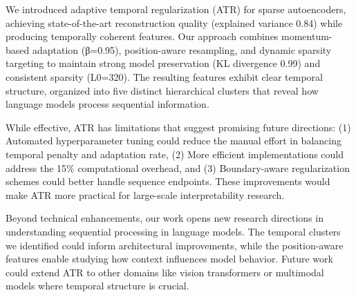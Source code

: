\documentclass{article} %
\begin{document}
We introduced adaptive temporal regularization (ATR) for sparse autoencoders, achieving state-of-the-art reconstruction quality (explained variance 0.84) while producing temporally coherent features. Our approach combines momentum-based adaptation (β=0.95), position-aware resampling, and dynamic sparsity targeting to maintain strong model preservation (KL divergence 0.99) and consistent sparsity (L0=320). The resulting features exhibit clear temporal structure, organized into five distinct hierarchical clusters that reveal how language models process sequential information.

While effective, ATR has limitations that suggest promising future directions: (1) Automated hyperparameter tuning could reduce the manual effort in balancing temporal penalty and adaptation rate, (2) More efficient implementations could address the 15\% computational overhead, and (3) Boundary-aware regularization schemes could better handle sequence endpoints. These improvements would make ATR more practical for large-scale interpretability research.

Beyond technical enhancements, our work opens new research directions in understanding sequential processing in language models. The temporal clusters we identified could inform architectural improvements, while the position-aware features enable studying how context influences model behavior. Future work could extend ATR to other domains like vision transformers or multimodal models where temporal structure is crucial.



\end{document}
